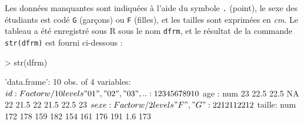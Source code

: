 \documentclass[11pt]{report}
\theoremstyle{definition}
\newcommand{\R}{\textsf{R}\xspace}
\begin{document}
Les données manquantes sont indiquées à l'aide du symbole \verb|.| (point),
le sexe des étudiants est codé \texttt{G} (garçons) ou \texttt{F} (filles),
et les tailles sont exprimées en \emph{cm}. Le tableau a été enregistré sous
\R sous le nom \texttt{dfrm}, et le résultat de la commande \verb|str(dfrm)|
est fourni ci-dessous :
\begin{Schunk}
\begin{Sinput}
> str(dfrm)
\end{Sinput}
\begin{Soutput}
'data.frame':	10 obs. of  4 variables:
 $ id    : Factor w/ 10 levels "01","02","03",..: 1 2 3 4 5 6 7 8 9 10
 $ age   : num  23 22.5 22.5 NA 22 21.5 22 21.5 22.5 23
 $ sexe  : Factor w/ 2 levels "F","G": 2 2 1 2 1 1 2 2 1 2
 $ taille: num  172 178 159 182 154 161 176 191 1.6 173
\end{Soutput}
\end{Schunk}
\end{document}
